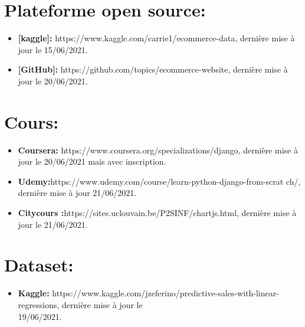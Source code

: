 \documentclass[a4paper]{report}
\begin{document}
\begin{doublespace}
\begin{doublespace}
\begin{doublespace}
\begin{doublespace}
\begin{doublespace}
                    \section{Plateforme open source:}
                    \begin{itemize}
                        \item \textbf{[kaggle]:}
                              https://www.kaggle.com/carrie1/ecommerce-data, dernière mise à jour le
                              15/06/2021.
                        \item \textbf{[GitHub]:}
                              https://github.com/topics/ecommerce-website, dernière mise à jour le
                              20/06/2021.
                    \end{itemize}
                    \section{Cours:}
                    \begin{itemize}
                        \item \textbf{Coursera:}
                              https://www.coursera.org/specializations/django, dernière mise à jour le
                              20/06/2021 mais avec inscription.

                        \item\textbf{Udemy:}https://www.udemy.com/course/learn-python-django-from-scrat
                              ch/, dernière mise à jour 21/06/2021.
                        \item \textbf{Citycours
                                  :}https://sites.uclouvain.be/P2SINF/chartjs.html, dernière mise à jour le
                              21/06/2021.
                    \end{itemize}
                    \section{Dataset:}
                    \begin{itemize}
                        \item \textbf{Kaggle:}
                              https://www.kaggle.com/jzeferino/predictive-sales-with-linear-regressions,
                              dernière mise à jour le\\ 19/06/2021.
                    \end{itemize}
                \end{doublespace}
            \end{doublespace}
        \end{doublespace}
    \end{doublespace}
\end{doublespace}
\end{document}
